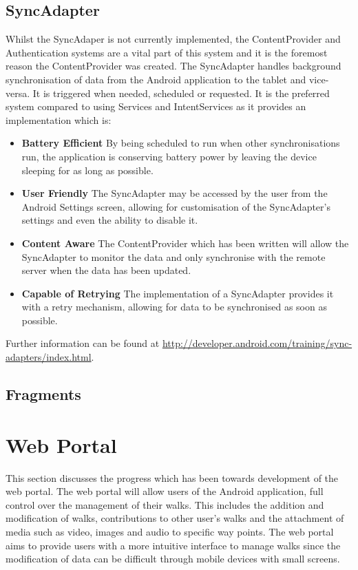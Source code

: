 \documentclass[11pt,a4paper]{article}
\begin{document}
\subsection{SyncAdapter}
\label{sec:syncAdapter}
Whilst the SyncAdaper is not currently implemented, the ContentProvider and Authentication systems are a vital part of this system and it is the foremost reason the ContentProvider was created. The SyncAdapter handles background synchronisation of data from the Android application to the tablet and vice-versa. It is triggered when needed, scheduled or requested. It is the preferred system compared to using Services and IntentServices as it provides an implementation which is:
\begin{itemize}
\item \textbf{Battery Efficient} By being scheduled to run when other synchronisations run, the application is conserving battery power by leaving the device sleeping for as long as possible.
\item \textbf{User Friendly} The SyncAdapter may be accessed by the user from the Android Settings screen, allowing for customisation of the SyncAdapter's settings and even the ability to disable it.
\item \textbf{Content Aware} The ContentProvider which has been written will allow the SyncAdapter to monitor the data and only synchronise with the remote server when the data has been updated.
\item \textbf{Capable of Retrying} The implementation of a SyncAdapter provides it with a retry mechanism, allowing for data to be synchronised as soon as possible.
\end{itemize}

Further information can be found at \url{http://developer.android.com/training/sync-adapters/index.html}.

\subsection{Fragments}
\label{sec:fragments}

\section{Web Portal}
\label{sec:web-portal}

This section discusses the progress which has been towards development of the web portal. The web portal will allow users of the Android application, full control over the management of their walks. This includes the addition and modification of walks, contributions to other user's walks and the attachment of media such as video, images and audio to specific way points. The web portal aims to provide users with a more intuitive interface to manage walks since the modification of data can be difficult through mobile devices with small screens.
\end{document}
